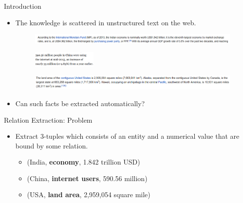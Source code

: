 \documentclass{beamer}
\begin{document}
\begin{frame}{Introduction}

\begin{itemize}
 
 \item  The knowledge is scattered in unstructured text on the web.
 
  \begin{figure}
    \centering
    \includegraphics[width = 1.0\textwidth]{images/ex_1}
  \end{figure}
  
  \begin{figure}
    \centering
    \includegraphics[width = 0.3\textwidth]{images/ex_2}
  \end{figure}
  
    \begin{figure}
    \centering
    \includegraphics[width = 1.0\textwidth]{images/ex_3}
  \end{figure}
  

  \item Can such facts be extracted automatically?
\end{itemize}

\end{frame}

\begin{frame}{Relation Extraction: Problem}
 
 \begin{itemize}
 \item Extract 3-tuples which consists of an entity and a numerical value that are bound by some relation.
  
    \begin{itemize}
	\item  (India, \textbf{economy}, 1.842 trillion USD)
	\item  (China, \textbf{internet users},  590.56 million)
	\item  (USA, \textbf{land area}, 2,959,054 square mile)
    \end{itemize}

 \end{itemize}

\end{frame}
\end{document}
